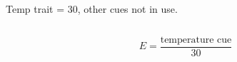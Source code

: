 \documentclass[pdf]{beamer}
\begin{document}
\begin{frame}
\begin{columns}


\begin{small}
Temp trait = 30, other cues not in use.
\end{small}
\end{columns}

\begin{tiny}
\[E=\frac{\text{temperature cue}}{30}\]
\end{tiny}
\end{frame}
%
\end{document}
